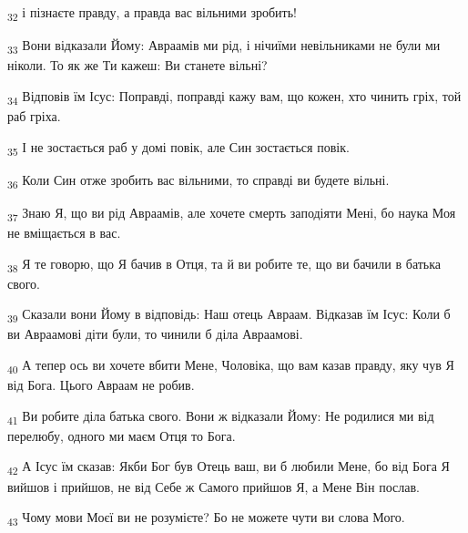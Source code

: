 \begin{tcolorbox}
\textsubscript{32} і пізнаєте правду, а правда вас вільними зробить!
\end{tcolorbox}
\begin{tcolorbox}
\textsubscript{33} Вони відказали Йому: Авраамів ми рід, і нічиїми невільниками не були ми ніколи. То як же Ти кажеш: Ви станете вільні?
\end{tcolorbox}
\begin{tcolorbox}
\textsubscript{34} Відповів їм Ісус: Поправді, поправді кажу вам, що кожен, хто чинить гріх, той раб гріха.
\end{tcolorbox}
\begin{tcolorbox}
\textsubscript{35} І не зостається раб у домі повік, але Син зостається повік.
\end{tcolorbox}
\begin{tcolorbox}
\textsubscript{36} Коли Син отже зробить вас вільними, то справді ви будете вільні.
\end{tcolorbox}
\begin{tcolorbox}
\textsubscript{37} Знаю Я, що ви рід Авраамів, але хочете смерть заподіяти Мені, бо наука Моя не вміщається в вас.
\end{tcolorbox}
\begin{tcolorbox}
\textsubscript{38} Я те говорю, що Я бачив в Отця, та й ви робите те, що ви бачили в батька свого.
\end{tcolorbox}
\begin{tcolorbox}
\textsubscript{39} Сказали вони Йому в відповідь: Наш отець Авраам. Відказав їм Ісус: Коли б ви Авраамові діти були, то чинили б діла Авраамові.
\end{tcolorbox}
\begin{tcolorbox}
\textsubscript{40} А тепер ось ви хочете вбити Мене, Чоловіка, що вам казав правду, яку чув Я від Бога. Цього Авраам не робив.
\end{tcolorbox}
\begin{tcolorbox}
\textsubscript{41} Ви робите діла батька свого. Вони ж відказали Йому: Не родилися ми від перелюбу, одного ми маєм Отця то Бога.
\end{tcolorbox}
\begin{tcolorbox}
\textsubscript{42} А Ісус їм сказав: Якби Бог був Отець ваш, ви б любили Мене, бо від Бога Я вийшов і прийшов, не від Себе ж Самого прийшов Я, а Мене Він послав.
\end{tcolorbox}
\begin{tcolorbox}
\textsubscript{43} Чому мови Моєї ви не розумієте? Бо не можете чути ви слова Мого.
\end{tcolorbox}
